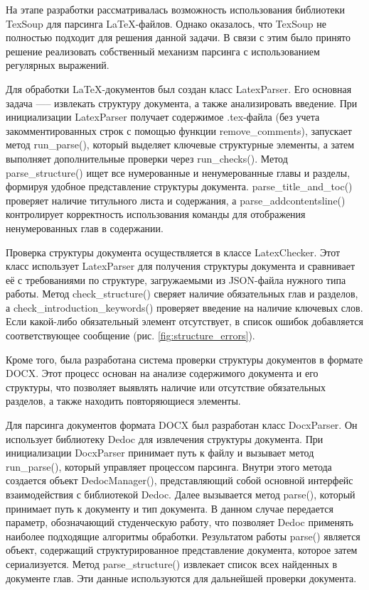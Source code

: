 \documentclass{report}
\begin{document}
На этапе разработки рассматривалась возможность использования библиотеки TexSoup для парсинга LaTeX-файлов. Однако оказалось, что TexSoup не полностью подходит для решения данной задачи. В связи с этим было принято решение реализовать собственный механизм парсинга с использованием регулярных выражений.

Для обработки LaTeX-документов был создан класс LatexParser. Его основная задача —-- извлекать структуру документа, а также анализировать введение. При инициализации LatexParser получает содержимое .tex-файла (без учета закомментированных строк с помощью функции remove\_comments), запускает метод run\_parse(), который выделяет ключевые структурные элементы, а затем выполняет дополнительные проверки через run\_checks(). Метод parse\_structure() ищет все нумерованные и ненумерованные главы и разделы, формируя удобное представление структуры документа. parse\_title\_and\_toc() проверяет наличие титульного листа и содержания, а parse\_addcontentsline() контролирует корректность использования команды для отображения ненумерованных глав в содержании.

Проверка структуры документа осуществляется в классе LatexChecker. Этот класс использует LatexParser для получения структуры документа и сравнивает её с требованиями по структуре, загружаемыми из JSON-файла нужного типа работы. Метод check\_structure() сверяет наличие обязательных глав и разделов, а check\_introduction\_keywords() проверяет введение на наличие ключевых слов. Если какой-либо обязательный элемент отсутствует, в список ошибок добавляется соответствующее сообщение (рис. \ref{fig:structure_errors}).


Кроме того, была разработана система проверки структуры документов в формате DOCX. Этот процесс основан на анализе содержимого документа и его структуры, что позволяет выявлять наличие или отсутствие обязательных разделов, а также находить повторяющиеся элементы.

Для парсинга документов формата DOCX был разработан класс DocxParser. Он использует библиотеку Dedoc для извлечения структуры документа. При инициализации DocxParser принимает путь к файлу и вызывает метод run\_parse(), который управляет процессом парсинга. Внутри этого метода создается объект DedocManager(), представляющий собой основной интерфейс взаимодействия с библиотекой Dedoc. Далее вызывается метод parse(), который принимает путь к документу и тип документа. В данном случае передается параметр, обозначающий студенческую работу, что позволяет Dedoc применять наиболее подходящие алгоритмы обработки. Результатом работы parse() является объект, содержащий структурированное представление документа, которое затем сериализуется. Метод parse\_structure() извлекает список всех найденных в документе глав. Эти данные используются для дальнейшей проверки документа.
\end{document}

